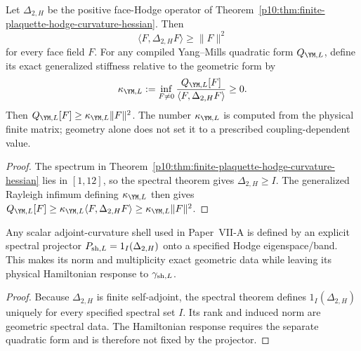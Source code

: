 \documentclass[12pt,a4paper]{article}
\begin{document}
\begin{theorem}
\label{p10:thm:bilinear-curvature-heat-time}
Let \(\Delta_{2,H}\) be the positive face-Hodge operator of Theorem~\ref{p10:thm:finite-plaquette-hodge-curvature-hessian}.  Then
\begin{equation}
\langle F,\Delta_{2,H}F\rangle\ge\|F\|^2
\end{equation}
for every face field \(F\).  For any compiled Yang--Mills quadratic form \(Q_{\YM,L}\), define its exact generalized stiffness relative to the geometric form by
\begin{equation}
\kappa_{\YM,L}:=\inf_{F\ne0}\frac{Q_{\YM,L}[F]}{\langle F,\Delta_{2,H}F\rangle}\ge0.
\end{equation}
Then \(Q_{\YM,L}[F]\ge\kappa_{\YM,L}\|F\|^2\).  The number \(\kappa_{\YM,L}\) is computed from the physical finite matrix; geometry alone does not set it to a prescribed coupling-dependent value.
\end{theorem}
\begin{proof}
The spectrum in Theorem~\ref{p10:thm:finite-plaquette-hodge-curvature-hessian} lies in $[1,12]$, so the spectral theorem gives $\Delta_{2,H}\ge I$.  The generalized Rayleigh infimum defining $\kappa_{\YM,L}$ then gives $Q_{\YM,L}[F]\ge\kappa_{\YM,L}\langle F,\Delta_{2,H}F\rangle\ge\kappa_{\YM,L}\|F\|^2$.
\end{proof}

\begin{theorem}
\label{p10:thm:scalar-shell-primitive-curvature-norm}
Any scalar adjoint-curvature shell used in Paper~VII-A is defined by an explicit spectral projector \(P_{{\rm sh},L}=1_I(\Delta_{2,H})\) onto a specified Hodge eigenspace/band.  This makes its norm and multiplicity exact geometric data while leaving its physical Hamiltonian response to \(\gamma_{{\rm sh},L}\).
\end{theorem}
\begin{proof}
Because $\Delta_{2,H}$ is finite self-adjoint, the spectral theorem defines $1_I(\Delta_{2,H})$ uniquely for every specified spectral set $I$.  Its rank and induced norm are geometric spectral data.  The Hamiltonian response requires the separate quadratic form and is therefore not fixed by the projector.
\end{proof}
\end{document}
